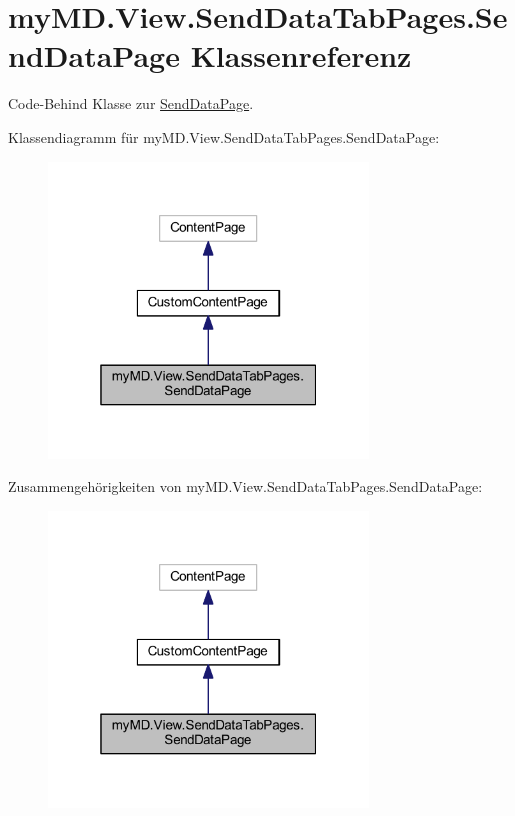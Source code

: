 \hypertarget{classmy_m_d_1_1_view_1_1_send_data_tab_pages_1_1_send_data_page}{}\section{my\+M\+D.\+View.\+Send\+Data\+Tab\+Pages.\+Send\+Data\+Page Klassenreferenz}
\label{classmy_m_d_1_1_view_1_1_send_data_tab_pages_1_1_send_data_page}


Code-\/\+Behind Klasse zur \mbox{\hyperlink{classmy_m_d_1_1_view_1_1_send_data_tab_pages_1_1_send_data_page}{Send\+Data\+Page}}.  




Klassendiagramm für my\+M\+D.\+View.\+Send\+Data\+Tab\+Pages.\+Send\+Data\+Page\+:\nopagebreak
\begin{figure}[H]
\begin{center}
\leavevmode
\includegraphics[width=241pt]{classmy_m_d_1_1_view_1_1_send_data_tab_pages_1_1_send_data_page__inherit__graph}
\end{center}
\end{figure}


Zusammengehörigkeiten von my\+M\+D.\+View.\+Send\+Data\+Tab\+Pages.\+Send\+Data\+Page\+:\nopagebreak
\begin{figure}[H]
\begin{center}
\leavevmode
\includegraphics[width=241pt]{classmy_m_d_1_1_view_1_1_send_data_tab_pages_1_1_send_data_page__coll__graph}
\end{center}
\end{figure}

